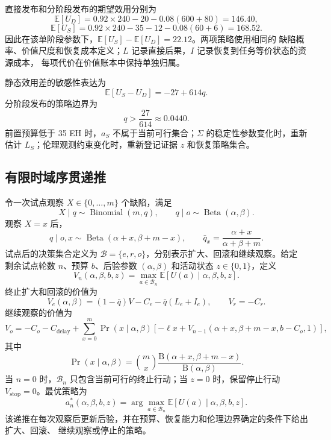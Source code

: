 \documentclass[11pt,a4paper]{ctexart}
\numberwithin{equation}{section}
\theoremstyle{definition}
\theoremstyle{plain}
\begin{document}
直接发布和分阶段发布的期望效用分别为
\[
\mathbb E[U_D]=0.92\times240-20-0.08(600+80)=146.40,
\]
\[
\mathbb E[U_S]=0.92\times240-35-12-0.08(60+6)=168.52.
\]
因此在该单阶段参数下，$\mathbb E[U_S]-\mathbb E[U_D]=22.12$。两项策略使用相同的
缺陷概率、价值尺度和恢复成本定义；$L$ 记录直接后果，$I$ 记录恢复到任务等价状态的资源成本，
每项代价在价值账本中保持单独归属。

静态效用差的敏感性表达为
\[
\mathbb E[U_S-U_D]=-27+614q.
\]
分阶段发布的策略边界为
\[
q>\frac{27}{614}\approx0.0440.
\]
前置预算低于 35 EH 时，$a_S$ 不属于当前可行集合；$\Sigma$ 的稳定性参数变化时，重新估计
$L_S$；伦理观测约束变化时，重新登记证据 $z$ 和恢复策略集合。

\subsection{有限时域序贯递推}

令一次试点观察 $X\in\{0,\ldots,m\}$ 个缺陷，满足
\[
X\mid q\sim\operatorname{Binomial}(m,q),
\qquad
q\mid o\sim\operatorname{Beta}(\alpha,\beta).
\]
观察 $X=x$ 后，
\[
q\mid o,x\sim\operatorname{Beta}(\alpha+x,\beta+m-x),
\qquad
\bar q_x=\frac{\alpha+x}{\alpha+\beta+m}.
\]
试点后的决策集合定义为 $\mathcal B=\{e,r,o\}$，分别表示扩大、回滚和继续观察。给定
剩余试点轮数 $n$、预算 $b$、后验参数 $(\alpha,\beta)$ 和活动状态 $z\in\{0,1\}$，定义
\begin{equation}
V_n(\alpha,\beta,b,z)=
\max_{a\in\mathcal B_n}
\mathbb E[U(a)\mid\alpha,\beta,b,z].
\label{eq:sequential-value}
\end{equation}
终止扩大和回滚的价值为
\begin{equation}
V_e(\alpha,\beta)=
(1-\bar q)V-C_e-\bar q(L_e+I_e),
\qquad
V_r=-C_r.
\label{eq:terminal-actions}
\end{equation}
继续观察的价值为
\begin{equation}
V_o=
-C_o-C_{\mathrm{delay}}
+\sum_{x=0}^{m}
\Pr(x\mid\alpha,\beta)
\left[
-\ell x+
V_{n-1}(\alpha+x,\beta+m-x,b-C_o,1)
\right],
\label{eq:observe-action}
\end{equation}
其中
\begin{equation}
\Pr(x\mid\alpha,\beta)
=
\binom{m}{x}
\frac{\mathrm B(\alpha+x,\beta+m-x)}
{\mathrm B(\alpha,\beta)}.
\label{eq:beta-binomial}
\end{equation}
当 $n=0$ 时，$\mathcal B_n$ 只包含当前可行的终止行动；当 $z=0$ 时，保留停止行动
$V_{\mathrm{stop}}=0$。最优策略为
\[
a_n^*(\alpha,\beta,b,z)=
\arg\max_{a\in\mathcal B_n}
\mathbb E[U(a)\mid\alpha,\beta,b,z].
\]
该递推在每次观察后更新后验，并在预算、恢复能力和伦理边界确定的条件下给出扩大、回滚、
继续观察或停止的策略。
\end{document}
